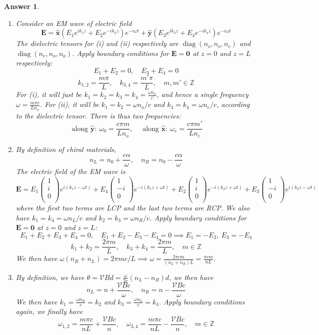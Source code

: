 \documentclass[a4paper]{article}
\DeclareMathOperator{\diag}{diag}
\newtheorem{ans}{Answer}
\theoremstyle{new}
\begin{document}
\begin{ans}\leavevmode
\begin{enumerate}[label=(\alph*)]
\item Consider an EM wave of electric field 
$$\mathbf{E}=\mathbf{\hat{x}}(E_1e^{ik_1z}+E_2e^{-ik_2z})e^{-i\omega t}+\mathbf{\hat{y}}(E_3e^{ik_3z}+E_4e^{-ik_4z})e^{-i\omega t}$$
The dielectric tensors for (i) and (ii) respectively are $\diag(n_o,n_o,n_e)$ and $\diag(n_e,n_o,n_o)$. Apply boundary conditions for $\mathbf{E}=\boldsymbol{0}$ at $z=0$ and $z=L$ respectively: 
$$E_1+E_2=0,\quad E_3+E_4=0$$
$$k_{1,2}=\frac{m\pi}{L},\quad k_{3,4}=\frac{m'\pi}{L},\quad m,m'\in\mathbb{Z}$$
For (i), it will just be $k_1=k_2=k_3=k_4=\frac{\omega n_o}{c}$, and hence a single frequency $\omega=\frac{m\pi c}{Ln_o}$. For (ii), it will be $k_1=k_2=\omega n_o/c$ and $k_3=k_4=\omega n_e/c$, according to the dielectric tensor. There is thus two frequencies:
$$\text{ along }\mathbf{\hat{y}}:~\omega_0=\frac{c\pi m}{Ln_o},\quad\text{ along }\mathbf{\hat{x}}:~\omega_e=\frac{c\pi m'}{L n_e}$$
\item By definition of chiral materials, 
$$n_L=n_0+\frac{c\alpha}{\omega},\quad n_R=n_0-\frac{c\alpha}{\omega}$$
The electric field of the EM wave is
$$\mathbf{E}=E_1\begin{pmatrix}1\\i\\0\\\end{pmatrix}e^{i(k_1z-\omega t)}+E_4\begin{pmatrix}1\\-i\\0\\\end{pmatrix}e^{-i(k_1z+\omega t)}+E_2\begin{pmatrix}1\\i\\0\\\end{pmatrix}e^{-i(k_2z+\omega t)}+E_3\begin{pmatrix}1\\-i\\0\\\end{pmatrix}e^{i(k_3z-\omega t)}$$
where the first two terms are LCP and the last two terms are RCP. We also have $k_1=k_4=\omega n_L/c$ and $k_2=k_3=\omega n_R/c$. Apply boundary conditions for $\mathbf{E}=\boldsymbol{0}$ at $z=0$ and $z=L$:
$$E_1+E_2+E_3+E_4=0,\quad E_1+E_2-E_3-E_4=0\implies E_1=-E_2,~E_3=-E_4$$
$$k_1+k_2=\frac{2\pi m}{L},\quad k_3+k_4=\frac{2\pi m}{L},\quad m\in\mathbb{Z}$$
We then have $\omega(n_R+n_L)=2\pi mc/L\implies\omega=\frac{2\pi cm}{(n_L+n_R)L}=\frac{\pi cm}{nL}$.
\item By definition, we have $\theta=\mathcal{V}Bd=\frac{\omega}{2c}(n_L-n_R)d$, we then have
$$n_L=n+\frac{\mathcal{V}Bc}{\omega},\quad n_R=n-\frac{\mathcal{V}Bc}{\omega}$$
We then have $k_1=\frac{\omega n_R}{c}=k_2$ and $k_3=\frac{\omega n_L}{c}=k_4$. Apply boundary conditions again, we finally have
$$\omega_{1,2}=\frac{m\pi c}{nL}+\frac{\mathcal{V}Bc}{n},\quad\omega_{3,4}=\frac{m\pi c}{nL}-\frac{\mathcal{V}Bc}{n},\quad m\in\mathbb{Z}$$
\end{enumerate}
\end{ans}
\end{document}
